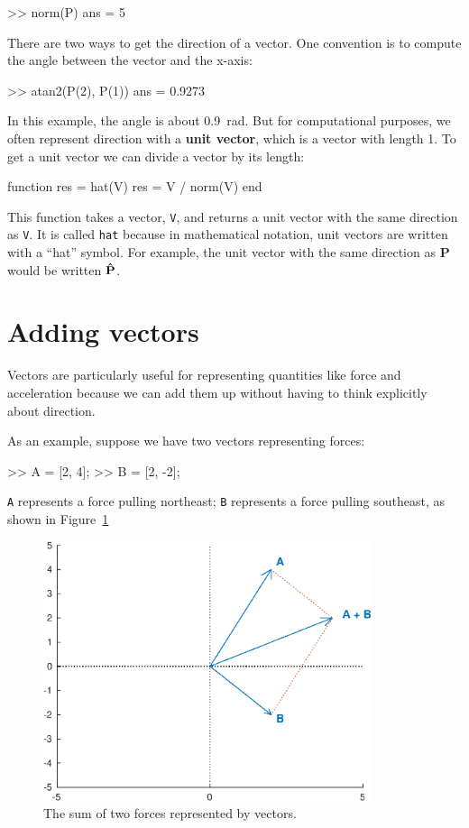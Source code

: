 \documentclass[
]{book}
\numberwithin{Answer}{chapter}
\numberwithin{Exercise}{chapter}
\renewcommand{\vec}[1]{\bm{\mathbf{#1}}}
\newcommand{\uveci}{{\bm{\hat{\textnormal{\bfseries\i}}}}}
\newcommand{\uvecj}{{\bm{\hat{\textnormal{\bfseries\j}}}}}
\newcommand{\uvec}[1]{%
    \ifthenelse{\equal{#1}{i}}%
        {\uveci}{%
    \ifthenelse{\equal{#1}{j}}%
        {\uvecj}{%
    {\bm{\hat{\mathbf{#1}}}}%
}}}
\begin{document}
\begin{code}
>> norm(P)
ans = 5
\end{code}

There are two ways to get the direction of a vector.  One convention is to compute the angle between the vector and the x-axis:

\begin{code}
>> atan2(P(2), P(1))
ans = 0.9273
\end{code}

In this example, the angle is about \SI{0.9}{\radian}.  But for computational purposes, we often represent direction with a {\bf unit vector}, which is a vector with length 1.  To get a unit vector we can divide a vector by its length:

\begin{code}
function res = hat(V)
    res = V / norm(V)
end
\end{code}
 
This function takes a vector, {\tt V}, and returns a unit vector with the same direction as {\tt V}.  It is called {\tt hat} because in mathematical notation, unit vectors are written with a ``hat'' symbol.  
For example, the unit vector with the same direction as $\vec{P}$ would be written $\uvec{P}$. 


\section{Adding vectors}

Vectors are particularly useful for representing quantities like force and acceleration because we can add them up without having to think explicitly about direction.

As an example, suppose we have two vectors representing forces:

\begin{code}
>> A = [2, 4];
>> B = [2, -2];
\end{code}

{\tt A} represents a force pulling northeast; {\tt B} represents a force pulling southeast, as shown in Figure~\ref{fig:vector2}

\begin{figure}
\centerline{\includegraphics[height=3in]{figs/vector2.eps}}
\caption{The sum of two forces represented by vectors.}
\label{fig:vector2}
\end{figure}
\end{document}
